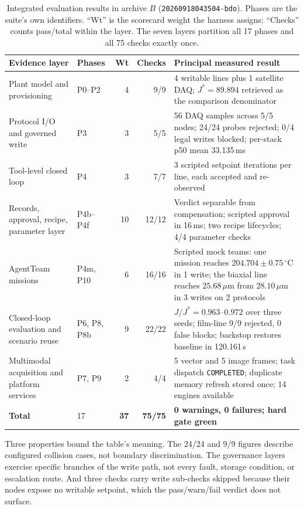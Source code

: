 \begin{table}[!tb]
\centering
\caption{Integrated evaluation results in archive $B$
(\texttt{20260918043504-bdo}). Phases are the suite's own identifiers. ``Wt'' is
the scorecard weight the harness assigns; ``Checks'' counts pass/total within
the layer. The seven layers partition all 17 phases and all 75 checks exactly
once.}
\label{tab:layers}
\scriptsize
\setlength{\tabcolsep}{4pt}
\begin{tabular}{@{}p{}p{}rrp{}@{}}
\toprule
Evidence layer & Phases & Wt & Checks & Principal measured result \\
\midrule
Plant model and provisioning & P0--P2 & 4 & 9/9 &
4 writable lines plus 1 satellite DAQ; $J^{*}=89.894$ retrieved as the comparison
denominator \\
Protocol I/O and governed write & P3 & 3 & 5/5 &
56 DAQ samples across 5/5 nodes; 24/24 probes rejected; 0/4 legal writes blocked;
per-stack p50 mean 33.135\,ms \\
Tool-level closed loop & P4 & 3 & 7/7 &
3 scripted setpoint iterations per line, each accepted and re-observed \\
Records, approval, recipe, parameter layer & P4b--P4f & 10 & 12/12 &
Verdict separable from compensation; scripted approval in 16\,ms; two recipe
lifecycles; 4/4 parameter checks \\
AgentTeam missions & P4m, P10 & 6 & 16/16 &
Scripted mock teams: one mission reaches $204.704\pm0.75\,^\circ$C in 1 write;
the biaxial line reaches $25.68\,\mu$m from $28.10\,\mu$m in 3 writes on 2
protocols \\
Closed-loop evaluation and scenario reuse & P6, P8, P8b & 9 & 22/22 &
$J/J^{*}=0.963$--$0.972$ over three seeds; film-line 9/9 rejected, 0 false
blocks; backstop restores baseline in 120.161\,s \\
Multimodal acquisition and platform services & P7, P9 & 2 & 4/4 &
5 vector and 5 image frames; task dispatch \texttt{COMPLETED}; duplicate memory
refresh stored once; 14 engines available \\
\midrule
\textbf{Total} & 17 & \textbf{37} & \textbf{75/75} &
\textbf{0 warnings, 0 failures; hard gate green} \\
\bottomrule
\end{tabular}
\end{table}

Three properties bound the table's meaning. The 24/24 and 9/9 figures describe configured collision cases, not boundary
discrimination. The governance layers
exercise specific branches of the write path, not every fault, storage condition, or
escalation route. And three checks carry write sub-checks skipped because their nodes expose no writable
setpoint, which the pass/warn/fail verdict does not surface.

